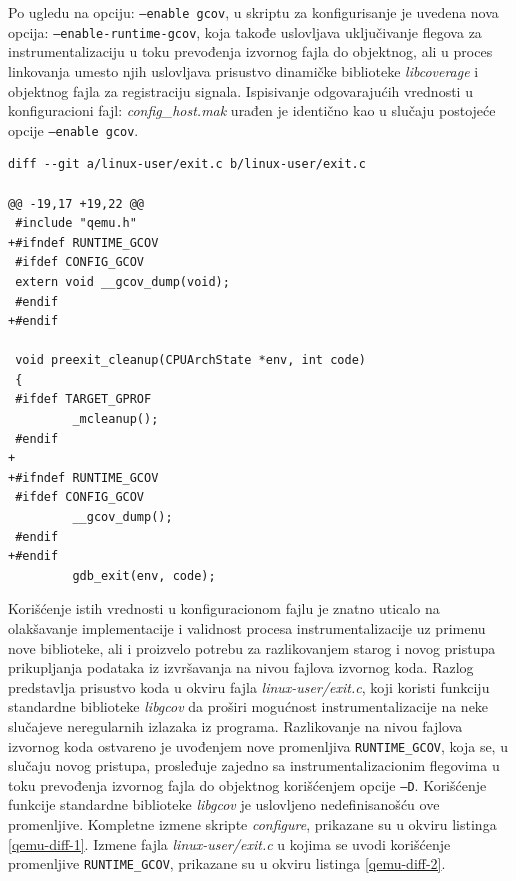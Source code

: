 \documentclass[12pt,oneside]{memoir}
\newcommand{\kod}[1]{\texttt{#1}}
\newcommand{\strano}[1]{\textit{#1}}
\begin{document}
Po ugledu na opciju: \kod{--enable gcov}, u skriptu za konfigurisanje je uvedena nova opcija: \kod{--enable-runtime-gcov}, koja takođe uslovljava uključivanje flegova za instrumentalizaciju u toku prevođenja izvornog fajla do objektnog, ali u proces linkovanja umesto njih uslovljava prisustvo dinamičke biblioteke \strano{libcoverage} i objektnog fajla za registraciju signala. Ispisivanje odgovarajućih vrednosti u konfiguracioni fajl: \strano{config\_host.mak} urađen je identično kao u slučaju postojeće opcije \kod{--enable gcov}. \\

\begin{lstlisting}[caption={Izmene fajla \strano{linux-user/exit.c}},frame=single, label=qemu-diff-2]
diff --git a/linux-user/exit.c b/linux-user/exit.c

@@ -19,17 +19,22 @@
 #include "qemu.h"
+#ifndef RUNTIME_GCOV
 #ifdef CONFIG_GCOV
 extern void __gcov_dump(void);
 #endif
+#endif
 
 void preexit_cleanup(CPUArchState *env, int code)
 {
 #ifdef TARGET_GPROF
         _mcleanup();
 #endif
+
+#ifndef RUNTIME_GCOV
 #ifdef CONFIG_GCOV
         __gcov_dump();
 #endif
+#endif
         gdb_exit(env, code);
\end{lstlisting}

Korišćenje istih vrednosti u konfiguracionom fajlu je znatno uticalo na olakšavanje implementacije i validnost procesa instrumentalizacije uz primenu nove biblioteke, ali i proizvelo potrebu za razlikovanjem starog i novog pristupa prikupljanja podataka iz izvršavanja na nivou fajlova izvornog koda. Razlog predstavlja prisustvo koda u okviru fajla \strano{linux-user/exit.c}, koji koristi funkciju standardne biblioteke \strano{libgcov} da proširi mogućnost instrumentalizacije na neke slučajeve neregularnih izlazaka iz programa. Razlikovanje na nivou fajlova izvornog koda ostvareno je uvođenjem nove promenljiva \kod{RUNTIME\_GCOV}, koja se, u slučaju novog pristupa, prosleđuje zajedno sa instrumentalizacionim flegovima u toku prevođenja izvornog fajla do objektnog korišćenjem opcije \kod{–D}. Korišćenje funkcije standardne biblioteke \strano{libgcov} je uslovljeno nedefinisanošću ove promenljive. Kompletne izmene skripte \strano{configure}, prikazane su u okviru listinga \ref{qemu-diff-1}. Izmene fajla \strano{linux-user/exit.c} u kojima se uvodi korišćenje promenljive \kod{RUNTIME\_GCOV}, prikazane su u okviru listinga \ref{qemu-diff-2}. \\
\end{document}
